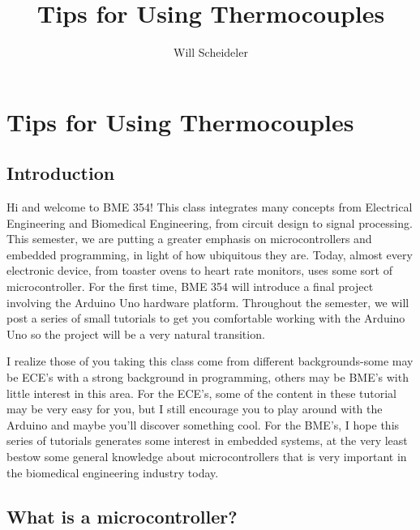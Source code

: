 \documentclass[10pt]{report}
\title{Tips for Using Thermocouples}
\author{Will Scheideler}
\begin{document}
\section*{Tips for Using Thermocouples}

\subsection*{Introduction}
Hi and welcome to BME 354! This class integrates many concepts from Electrical Engineering and Biomedical Engineering, from circuit design to signal processing. This semester, we are putting a greater emphasis on microcontrollers and embedded programming, in light of how ubiquitous they are. Today, almost every electronic device, from toaster ovens to heart rate monitors, uses some sort of microcontroller. For the first time, BME 354 will introduce a final project involving the Arduino Uno hardware platform. Throughout the semester, we will post a series of small tutorials to get you comfortable working with the Arduino Uno so the project will be a very natural transition.
\par
I realize those of you taking this class come from different backgrounds-some may be ECE’s with a strong background in programming, others may be BME’s with little interest in this area. For the ECE’s, some of the content in these tutorial may be very easy for you, but I still encourage you to play around with the Arduino and maybe you’ll discover something cool. For the BME’s, I hope this series of tutorials generates some interest in embedded systems, at the very least bestow some general knowledge about microcontrollers that is very important in the biomedical engineering industry today.

\subsection*{What is a microcontroller?}
\end{document}
